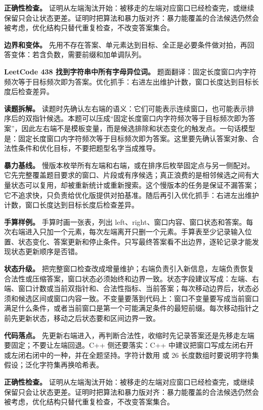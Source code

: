 \textbf{正确性检查。} 证明从左端淘汰开始：被移走的左端对应窗口已经检查完，或继续保留只会让状态更差。证明时把算法和暴力版对齐：暴力能覆盖的合法候选仍然会被考虑，优化结构只替代重复检查，不改变答案集合。

\textbf{边界和变体。} 先用不存在答案、单元素达到目标、全正是必要条件做对拍，再回答变体：若含负数，需要前缀和加单调队列。

\noindent\textbf{LeetCode 438 找到字符串中所有字母异位词。} 题面翻译：固定长度窗口内字符频次等于目标频次即为答案。优化抓手：右进左出维护计数，窗口长度达到目标长度后检查差异。

\textbf{读题拆解。} 读题时先确认左右端的语义：它们可能表示连续窗口，也可能表示排序后的双指针候选。本题可以压成“固定长度窗口内字符频次等于目标频次即为答案”，因此左右端不是模板变量，而是候选排除和状态变化的触发点。一句话模型是：固定长度窗口内字符频次等于目标频次即为答案。这里要先确认答案对象、合法性条件和优化目标，不要把题型名字当成推导。

\textbf{暴力基线。} 慢版本枚举所有左端和右端，或在排序后枚举固定点与另一侧配对。它先完整覆盖题目要求的窗口、片段或有序候选；真正浪费的是相邻候选之间有大量状态可以复用，却被重新统计或重新搜索。这个慢版本的任务是保证不漏答案；它不追求快，只负责给优化版提供对拍基准。随后再引入优化抓手：右进左出维护计数，窗口长度达到目标长度后检查差异。

\textbf{手算样例。} 手算时画一张表，列出 left、right、窗口内容、窗口状态和答案。每次右端进入只加一个元素，每次左端离开只删一个元素。手算表至少记录输入位置、状态变化、答案更新和停止条件。只写最终答案看不出边界，逐轮记录才能发现状态更新顺序是否错。

\textbf{状态升级。} 把完整窗口检查改成增量维护；右端负责引入新信息，左端负责恢复合法性或压缩答案，窗口状态必须始终和边界一致。状态字段建议写成：左端、右端、窗口计数或当前双指针和、合法性指标、当前答案；每次移动边界后，状态必须和候选区间或窗口内容一致。不变量要落到代码上：窗口不变量要写成当前窗口满足什么条件，或者当前窗口是第一个可能满足条件的最短前缀。每次移动指针之前先更新状态，移动之后状态要和区间边界一致。

\textbf{代码落点。} 先更新右端进入，再判断合法性，收缩时先记录答案还是先移走左端要固定；不要让左端回退。C++ 侧还要落实：C++ 中建议把窗口写成左闭右开或左闭右闭中的一种，并在全题坚持。字符计数用  或 26 长度数组时要说明字符集假设；泛化字符集再换哈希表。

\textbf{正确性检查。} 证明从左端淘汰开始：被移走的左端对应窗口已经检查完，或继续保留只会让状态更差。证明时把算法和暴力版对齐：暴力能覆盖的合法候选仍然会被考虑，优化结构只替代重复检查，不改变答案集合。

